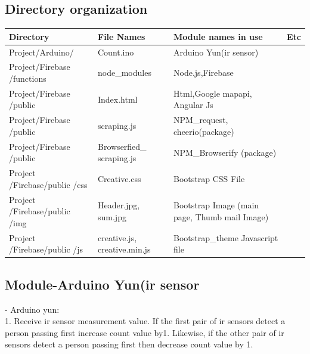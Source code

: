 \documentclass[journal]{IEEEtran}
\begin{document}
\subsection{Directory organization}


\begin{table}[h]

\renewcommand{\arraystretch}{2.3}
\centering
\begin{tabular}{ | m{2cm} | m{1.5cm}| m{2.7cm} | m{0.5cm} |} 
\hline
\bfseries Directory & \bfseries File Names & \bfseries Module names in use & \bfseries Etc \\
\hline

Project/Arduino/ & Count.ino &Arduino Yun(ir sensor)&\\
\hline

Project/Firebase /functions  & node\_modules & Node.js,Firebase&\\
\hline

Project/Firebase /public  & Index.html &Html,Google mapapi, Angular Js&\\
\hline

Project/Firebase /public  & scraping.js &NPM\_request, cheerio(package)&\\
\hline

Project/Firebase /public  &Browserfied\_ scraping.js 

&NPM\_Browserify
(package)&\\
\hline

Project /Firebase/public
/css
 & Creative.css &Bootstrap
CSS
File
&\\
\hline

Project /Firebase/public
/img
 & Header.jpg, sum.jpg &Bootstrap
Image
(main page,
Thumb mail
Image)
&\\
\hline

Project /Firebase/public
/js
 &creative.js, creative.min.js&Bootstrap\_theme
Javascript file
&\\


\hline
\end{tabular}
\end{table}


\subsection{Module-Arduino Yun(ir sensor}
- Arduino yun:  \\
1. Receive ir sensor measurement value.
 If the first pair of ir sensors detect a person passing first increase count value by1. Likewise, if the other pair of ir sensors detect a person passing first then decrease count value by 1.
\end{document}
